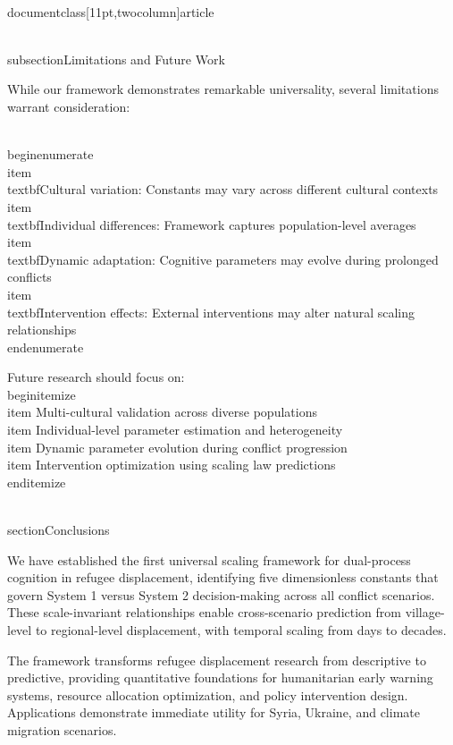 \\documentclass[11pt,twocolumn]{article}
\begin{document}
{{\\subsection{Limitations and Future Work}

While our framework demonstrates remarkable universality, several limitations warrant consideration:

\\begin{enumerate}
    \\item \\textbf{Cultural variation}: Constants may vary across different cultural contexts
    \\item \\textbf{Individual differences}: Framework captures population-level averages
    \\item \\textbf{Dynamic adaptation}: Cognitive parameters may evolve during prolonged conflicts
    \\item \\textbf{Intervention effects}: External interventions may alter natural scaling relationships
\\end{enumerate}

Future research should focus on:
\\begin{itemize}
    \\item Multi-cultural validation across diverse populations
    \\item Individual-level parameter estimation and heterogeneity
    \\item Dynamic parameter evolution during conflict progression
    \\item Intervention optimization using scaling law predictions
\\end{itemize}

\\section{Conclusions}

We have established the first universal scaling framework for dual-process cognition in refugee displacement, identifying five dimensionless constants that govern System 1 versus System 2 decision-making across all conflict scenarios. These scale-invariant relationships enable cross-scenario prediction from village-level to regional-level displacement, with temporal scaling from days to decades.

The framework transforms refugee displacement research from descriptive to predictive, providing quantitative foundations for humanitarian early warning systems, resource allocation optimization, and policy intervention design. Applications demonstrate immediate utility for Syria, Ukraine, and climate migration scenarios.

}}
\end{document}
